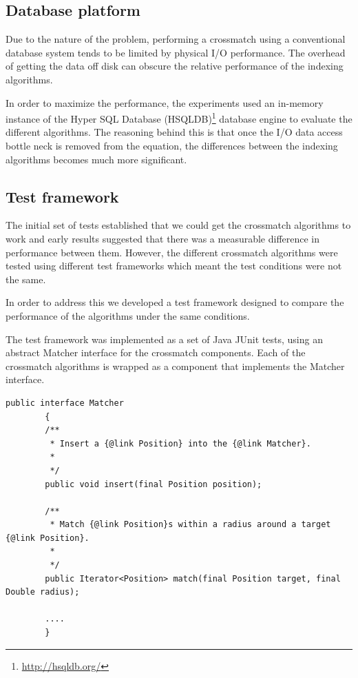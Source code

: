 \documentclass{article}
\newcommand{\junit} {JUnit\xspace}
\newcommand{\hsqldb} {HSQLDB\xspace}
\newcommand{\crossmatch} {crossmatch\xspace}
\newcommand{\hdisk} {disk\xspace}
\newcommand{\footurl}[1] {\footnote{\url{#1}}}
\newcommand{\javaname}[1] {{\ttfamily\color{codeblue} #1}}
\begin{document}
\subsection{Database platform}
\label{database-platform}

Due to the nature of the problem, performing a \crossmatch using a conventional database system tends to be limited by physical I/O performance. The overhead of getting the data off \hdisk can obscure the relative performance of the indexing algorithms.

In order to maximize the performance, the experiments used an in-memory instance of the Hyper SQL Database (\hsqldb)\footurl{http://hsqldb.org/} database engine to evaluate the different algorithms. The reasoning behind this is that once the I/O data access bottle neck is removed from the equation, the differences between the indexing algorithms becomes much more significant.

\subsection{Test framework}
\label{test-framework}

The initial set of tests established that we could get the  \crossmatch algorithms to work and early results suggested that there was a measurable difference in performance between them.
However, the different \crossmatch algorithms were tested using different test frameworks which meant the test conditions were not the same.

In order to address this we developed a test framework designed to compare the performance of the algorithms under the same conditions.

The test framework was implemented as a set of Java \junit tests, using an abstract \javaname{Matcher} interface for the \crossmatch components.
Each of the \crossmatch algorithms is wrapped as a component that implements the \javaname{Matcher} interface.

\begin{lstlisting}[style=Java]
    public interface Matcher
        {
        /**
         * Insert a {@link Position} into the {@link Matcher}.
         * 
         */
        public void insert(final Position position);

        /**
         * Match {@link Position}s within a radius around a target {@link Position}.
         * 
         */
        public Iterator<Position> match(final Position target, final Double radius);

        ....
        }
\end{lstlisting}
\end{document}
